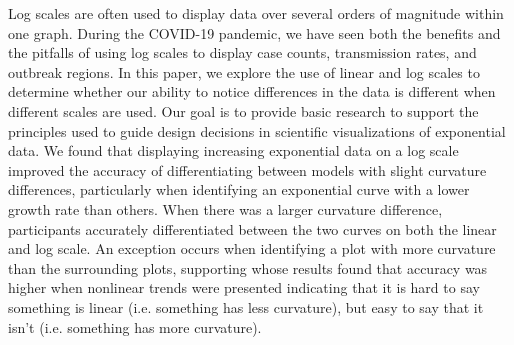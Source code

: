   Log scales are often used to display data over several orders of magnitude within one graph. During the COVID-19 pandemic, we have seen both the benefits and the pitfalls of using log scales to display case counts, transmission rates, and outbreak regions. In this paper, we explore the use of linear and log scales to determine whether our ability to notice differences in the data is different when different scales are used. Our goal is to provide basic research to support the principles used to guide design decisions in scientific visualizations of exponential data. We found that displaying increasing exponential data on a log scale improved the accuracy of differentiating between models with slight curvature differences, particularly when identifying an exponential curve with a lower growth rate than others. When there was a larger curvature difference, participants accurately differentiated between the two curves on both the linear and log scale. An exception occurs when identifying a plot with more curvature than the surrounding plots, supporting \cite{best_perception_2007} whose results found that accuracy was higher when nonlinear trends were presented indicating that it is hard to say something is linear (i.e. something has less curvature), but easy to say that it isn't (i.e. something has more curvature).
